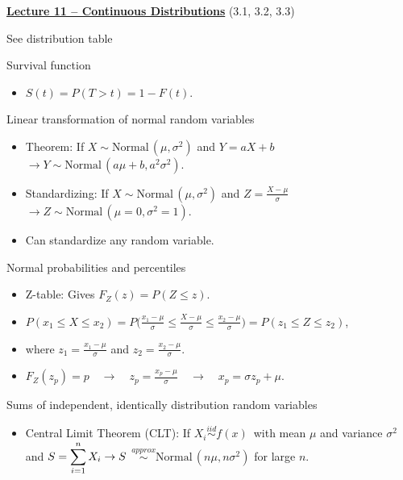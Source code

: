 \documentclass{article}
\newcommand{\bu}[1]{\textbf{\ul{#1}}}				%
\newcommand{\followsp}[2]{\overset{#1}\sim \text{#2}\,}		%
\begin{document}
\vspace{50pt}

{\large \bu{Lecture 11 -- Continuous Distributions}} (3.1, 3.2, 3.3)\bigskip

See distribution table\bigskip

Survival function
\begin{itemize}
    \item $S(t) = P(T > t) = 1 - F(t)$.
\end{itemize}\bigskip

\newpage

Linear transformation of normal random variables 
\begin{itemize}
    \item Theorem: If $X \sim \text{Normal}\,(\mu, \sigma^2)$ and $Y = aX + b$ $\rightarrow Y \sim \text{Normal}\,(a\mu + b, a^2\sigma^2)$.
    \item Standardizing: If $X \sim \text{Normal}\,(\mu, \sigma^2)$ and $Z = \frac{X -\mu}{\sigma}$ $\rightarrow Z \sim \text{Normal}\,(\mu = 0,\sigma^2 = 1)$.
    \item Can standardize any random variable.
\end{itemize}\bigskip

Normal probabilities and percentiles
\begin{itemize}
    \item Z-table: Gives $F_Z(z) = P(Z \le z)$.
    \item $P(x_1 \le X \le x_2) = P\Big(\frac{x_1 - \mu}{\sigma} \le \frac{X - \mu}{\sigma} \le \frac{x_2 - \mu}{\sigma}\Big) = P(z_1 \le Z \le z_2)$,
    \item[] where $z_1 = \frac{x_1 - \mu}{\sigma}$ and $\displaystyle z_2 = \frac{x_2 - \mu}{\sigma}$.
    \item $F_Z(z_p) = p \quad \rightarrow \quad z_p = \frac{x_p - \mu}{\sigma} \quad \rightarrow \quad x_p = \sigma z_p + \mu$.
\end{itemize}\bigskip

Sums of independent, identically distribution random variables
\begin{itemize}
    \item Central Limit Theorem (CLT): If $X_i \followsp{iid}{$f(x)$}$ with mean $\mu$ and variance $\sigma^2$ and $\displaystyle S = \sum_{i = 1}^n X_i \\ \rightarrow S$ $\followsp{approx}{Normal}(n\mu, n\sigma^2)$ for large $n$.
\end{itemize}

\vspace{50pt}
\end{document}
